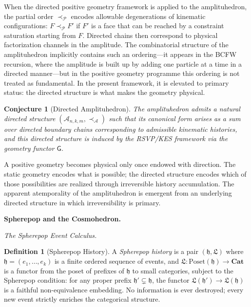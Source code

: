 \documentclass[12pt, oneside]{amsart}
\theoremstyle{plain}
\newtheorem{conjecture}[theorem]{Conjecture}
\theoremstyle{definition}
\newtheorem{definition}[theorem]{Definition}
\theoremstyle{remark}
\newcommand{\hist}{\mathfrak{h}}
\newcommand{\Log}{\mathfrak{L}}
\newcommand{\Gfun}{\mathsf{G}}
\begin{document}
When the directed positive geometry framework is applied to the amplituhedron, the partial order $\prec_{\mathcal{P}}$ encodes allowable degenerations of kinematic configurations: $F \prec_{\mathcal{P}} F'$ if $F'$ is a face that can be reached by a constraint saturation starting from $F$. Directed chains then correspond to physical factorization channels in the amplitude. The combinatorial structure of the amplituhedron implicitly contains such an ordering---it appears in the BCFW recursion, where the amplitude is built up by adding one particle at a time in a directed manner---but in the positive geometry programme this ordering is not treated as fundamental. In the present framework, it is elevated to primary status: the directed structure is what makes the geometry physical.

\begin{conjecture}[Directed Amplituhedron]
\label{conj:directed-amplituhedron}
The amplituhedron admits a natural directed structure $(\mathcal{A}_{n,k,m}, \prec_{\mathcal{A}})$ such that its canonical form arises as a sum over directed boundary chains corresponding to admissible kinematic histories, and this directed structure is induced by the RSVP/KES framework via the geometry functor $\Gfun$.
\end{conjecture}

A positive geometry becomes physical only once endowed with direction. The static geometry encodes what is possible; the directed structure encodes which of those possibilities are realized through irreversible history accumulation. The apparent atemporality of the amplituhedron is emergent from an underlying directed structure in which irreversibility is primary.

\bigskip\noindent\textbf{Spherepop and the Cosmohedron.}
\label{sec:spherepop}

\medskip\noindent\textit{The Spherepop Event Calculus.}

\begin{definition}[Spherepop History]
A \emph{Spherepop history} is a pair $(\hist, \Log)$ where $\hist = (e_1, \ldots, e_k)$ is a finite ordered sequence of events, and $\Log: \mathrm{Poset}(\hist) \to \mathbf{Cat}$ is a functor from the poset of prefixes of $\hist$ to small categories, subject to the Spherepop condition: for any proper prefix $\hist' \subsetneq \hist$, the functor $\Log(\hist') \to \Log(\hist)$ is a faithful non-equivalence embedding. No information is ever destroyed; every new event strictly enriches the categorical structure.
\end{definition}
\end{document}
